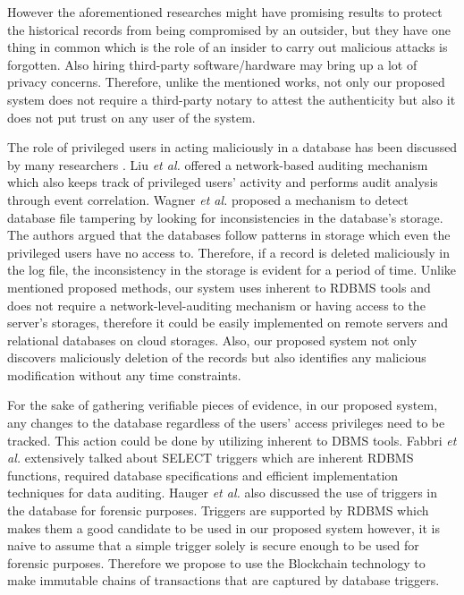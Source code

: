		However the aforementioned researches might have promising results to protect the historical records from being compromised by an outsider, but they have one thing in common which is the role of an insider to carry out malicious attacks is forgotten. Also hiring third-party software/hardware may bring up a lot of privacy concerns. Therefore, unlike the mentioned works, not only our proposed system does not require a third-party notary to attest the authenticity but also it does not put trust on any user of the system.

		The role of privileged users in acting maliciously in a database has been discussed by many researchers \cite{crosby2009tamper-evident} \cite{wagner2018detect}. Liu {\it et al.} offered a network-based auditing mechanism which also keeps track of privileged users' activity and performs audit analysis through event correlation. Wagner {\it et al.} \cite{wanger2017carving} proposed a mechanism to detect database file tampering by looking for inconsistencies in the database's storage. The authors argued that the databases follow patterns in storage which even the privileged users have no access to. Therefore, if a record is deleted maliciously in the log file, the inconsistency in the storage is evident for a period of time. Unlike mentioned proposed methods, our system uses inherent to RDBMS tools and does not require a network-level-auditing mechanism or having access to the server's storages, therefore it could be easily implemented on remote servers and relational databases on cloud storages. Also, our proposed system not only discovers maliciously deletion of the records but also identifies any malicious modification without any time constraints.

		For the sake of gathering verifiable pieces of evidence, in our proposed system, any changes to the database regardless of the users' access privileges need to be tracked. This action could be done by utilizing inherent to DBMS tools. Fabbri {\it et al.} \cite{fabbri2013select} extensively talked about SELECT triggers which are inherent RDBMS functions, required database specifications and efficient implementation techniques for data auditing. Hauger {\it et al.}\cite{hauger2014information} also discussed the use of triggers in the database for forensic purposes. Triggers are supported by RDBMS which makes them a good candidate to be used in our proposed system however, it is naive to assume that a simple trigger solely is secure enough to be used for forensic purposes. Therefore we propose to use the Blockchain technology to make immutable chains of transactions that are captured by database triggers.

